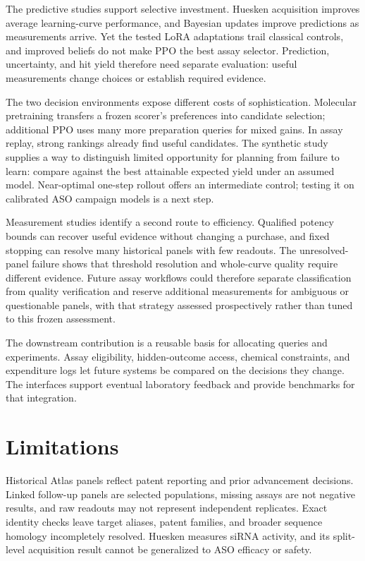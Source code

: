 \documentclass[letterpaper]{article}
\begin{document}
The predictive studies support selective investment. Huesken acquisition improves average learning-curve performance, and Bayesian updates improve predictions as measurements arrive. Yet the tested LoRA adaptations trail classical controls, and improved beliefs do not make PPO the best assay selector. Prediction, uncertainty, and hit yield therefore need separate evaluation: useful measurements change choices or establish required evidence.

The two decision environments expose different costs of sophistication. Molecular pretraining transfers a frozen scorer's preferences into candidate selection; additional PPO uses many more preparation queries for mixed gains. In assay replay, strong rankings already find useful candidates. The synthetic study supplies a way to distinguish limited opportunity for planning from failure to learn: compare against the best attainable expected yield under an assumed model. Near-optimal one-step rollout offers an intermediate control; testing it on calibrated ASO campaign models is a next step.

Measurement studies identify a second route to efficiency. Qualified potency bounds can recover useful evidence without changing a purchase, and fixed stopping can resolve many historical panels with few readouts. The unresolved-panel failure shows that threshold resolution and whole-curve quality require different evidence. Future assay workflows could therefore separate classification from quality verification and reserve additional measurements for ambiguous or questionable panels, with that strategy assessed prospectively rather than tuned to this frozen assessment.

The downstream contribution is a reusable basis for allocating queries and experiments. Assay eligibility, hidden-outcome access, chemical constraints, and expenditure logs let future systems be compared on the decisions they change. The interfaces support eventual laboratory feedback and provide benchmarks for that integration.

\section{Limitations}
Historical Atlas panels reflect patent reporting and prior advancement decisions. Linked follow-up panels are selected populations, missing assays are not negative results, and raw readouts may not represent independent replicates. Exact identity checks leave target aliases, patent families, and broader sequence homology incompletely resolved. Huesken measures siRNA activity, and its split-level acquisition result cannot be generalized to ASO efficacy or safety.
\end{document}
